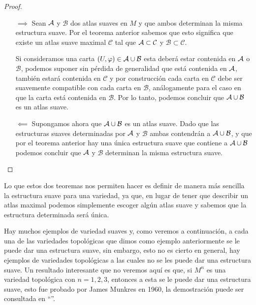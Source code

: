 \begin{proof}
	\begin{itemize}
		\item [$\implies$] Sean $\mathcal{A}$ y $\mathcal{B}$ dos atlas suaves en $M$ y que ambos determinan la misma estructura suave. Por el teorema anterior sabemos que esto significa que existe un atlas suave maximal $\mathcal{C}$ tal que $\mathcal{A} \subset \mathcal{C}$ y $\mathcal{B} \subset \mathcal{C}$.

		      Si consideramos una carta $(U,\varphi) \in \mathcal{A} \cup \mathcal{B}$ esta deberá estar contenida en $\mathcal{A}$ o $\mathcal{B}$, podemos suponer sin pérdida de generalidad que está contenida en $\mathcal{A}$, también estará contenida en $\mathcal{C}$ y por construcción cada carta en $\mathcal{C}$ debe ser suavemente compatible con cada carta en $\mathcal{B}$, análogamente para el caso en que la carta está contenida en $\mathcal{B}$. Por lo tanto, podemos concluir que $\mathcal{A} \cup \mathcal{B}$ es un atlas suave.
		\item [$\impliedby$] Supongamos ahora que $\mathcal{A} \cup \mathcal{B}$ es un atlas suave. Dado que las estructuras suaves determinadas por $\mathcal{A}$ y $\mathcal{B}$ ambas contendrán a $\mathcal{A} \cup \mathcal{B}$, y que por el teorema anterior hay una única estructura suave que contiene a $\mathcal{A} \cup \mathcal{B}$ podemos concluir que $\mathcal{A}$ y $\mathcal{B}$ determinan la misma estructura suave.
	\end{itemize}
\end{proof}

Lo que estos dos teoremas nos permiten hacer es definir de manera más sencilla la estructura suave para una variedad, ya que, en lugar de tener que describir un atlas maximal podemos simplemente escoger algún atlas suave y sabemos que la estructura determinada será única.

Hay muchos ejemplos de variedad suaves y, como veremos a continuación, a cada una de las variedades topológicas que dimos como ejemplo anteriormente se le puede dar una estructura suave, sin embargo, esto no es cierto en general, hay ejemplos de variedades topológicas a las cuales no se les puede dar una estructura suave. Un resultado interesante que no veremos aquí es que, si $M^n$ es una variedad topológica con $n=1,2,3$, entonces a esta se le puede dar una estructura suave, esto fue probado por James Munkres en 1960, la demostración puede ser consultada en \enquote{\textcite{munkres1960obstructions}}.



